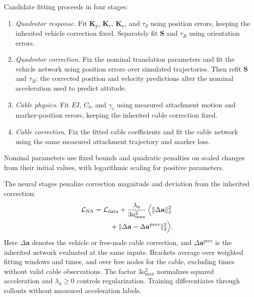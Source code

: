 \documentclass[letterpaper, 10 pt, conference]{ieeeconf}
\begin{document}
Candidate fitting proceeds in four stages:
\begin{enumerate}
    \item \emph{Quadrotor response.}
    Fit $\mathbf K_p$, $\mathbf K_v$, $\mathbf K_a$, and
    $\tau_d$ using position errors, keeping the inherited vehicle
    correction fixed. Separately fit $\mathbf S$ and $\tau_R$
    using orientation errors.

    \item \emph{Quadrotor correction.}
    Fix the nominal translation parameters and fit the vehicle
    network using position errors over simulated trajectories.
    Then refit $\mathbf S$ and $\tau_R$: the corrected position
    and velocity predictions alter the nominal acceleration
    used to predict attitude.

    \item \emph{Cable physics.}
    Fit $EI$, $C_b$, and $\gamma_c$ using measured attachment
    motion and marker-position errors, keeping the inherited
    cable correction fixed.

    \item \emph{Cable correction.}
    Fix the fitted cable coefficients and fit the cable network
    using the same measured attachment trajectory and marker loss.
\end{enumerate}

Nominal parameters use fixed bounds and quadratic penalties on
scaled changes from their initial values, with logarithmic
scaling for positive parameters.

The neural stages penalize correction magnitude and deviation
from the inherited correction:
\begin{equation}
\begin{aligned}
\mathcal L_{\mathrm{NN}}
={}&\mathcal L_{\mathrm{data}}+\frac{\lambda_a}{3a_{\max}^2}\,
\Bigl\langle\|\Delta\mathbf a\|_2^2\\
&\quad+\|\Delta\mathbf a-\Delta\mathbf a^{\mathrm{prev}}\|_2^2\Bigr\rangle.
\end{aligned}
\label{eq:refinement_neural_loss}
\end{equation}
Here $\Delta\mathbf a$ denotes the vehicle or free-node cable
correction, and $\Delta\mathbf a^{\mathrm{prev}}$ is the
inherited network evaluated at the same inputs.
Brackets average over weighted fitting windows and times, and
over free nodes for the cable, excluding times without valid
cable observations.
The factor $3a_{\max}^2$ normalizes squared acceleration and
$\lambda_a\geq0$ controls regularization. Training differentiates
through rollouts without measured acceleration labels.
\end{document}
